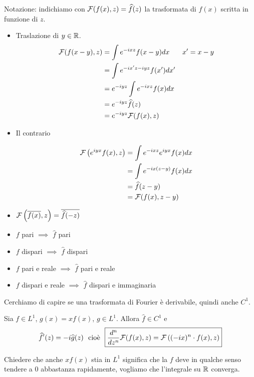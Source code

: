 Notazione: indichiamo con $\mathcal{F}(f(x), z) = \widehat{f}(z)$ la trasformata di $f(x)$ scritta in funzione di $z$.
\begin{itemize}
\item Traslazione di $y\in \mathbb{R}$.
\begin{equation*}
\begin{aligned}
\mathcal{F}(f(x - y), z) & = \int e^{- ixz} f(x - y) dx & x' = x - y\\
 & = \int e^{- ix'z - iyz} f(x') dx' & \\
 & = e^{- iyz}\int e^{- ixz} f(x) dx & \\
 & = e^{- iyz}\widehat{f}(z) & \\
 & = e^{- iyz}\mathcal{F}(f(x), z) &
\end{aligned}
\end{equation*}
\item Il contrario

\begin{equation*}
\begin{aligned}
\mathcal{F}\left(e^{iyx} f(x), z\right) & = \int e^{- ixz} e^{iyx} f(x) dx\\
 & = \int e^{- ix(z - y)} f(x) dx\\
 & = \widehat{f}(z - y)\\
 & = \mathcal{F}(f(x), z - y)
\end{aligned}
\end{equation*}
\item $\mathcal{F}\left(\overline{f(x)}, z\right) = \overline{\widehat{f}(- z)}$
\item $f$ pari $\implies $ $\hat{f}$ pari
\item $f$ dispari $\implies $ $\hat{f}$ dispari
\item $f$ pari e reale $\implies $ $\hat{f}$ pari e reale
\item $f$ dispari e reale $\implies $ $\hat{f}$ dispari e immaginaria
\end{itemize}

Cerchiamo di capire se una trasformata di Fourier è derivabile, quindi anche $C^{1}$.
\begin{thm}
Sia $f\in L^{1}$, $g(x) = xf(x)$, $g\in L^{1}$. Allora $\hat{f} \in C^{1}$ e
\begin{equation*}
\hat{f}'(z) = - i\hat{g}(z) \ \ \text{cioè} \ \ \boxed{\frac{d^{n}}{dz^{n}}\Fc(f(x), z) = \Fc\left((- ix)^{n} \cdot f(x), z\right)}
\end{equation*}
\end{thm}
Chiedere che anche $xf(x)$ stia in $L^{1}$ significa che la $f$ deve in qualche senso tendere a $0$ abbastanza rapidamente, vogliamo che l'integrale su $\mathbb{R}$ converga.

